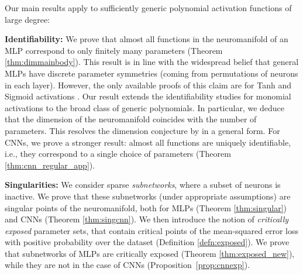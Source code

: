\documentclass{article} %
\theoremstyle{plain}%
\theoremstyle{definition}
\theoremstyle{remark}
\begin{document}
Our main results apply to sufficiently generic polynomial activation functions of large degree: 

\textbf{Identifiability:} We prove that almost all functions in the neuromanifold of an MLP correspond to only finitely many parameters (Theorem \ref{thm:dimmainbody}).
This result is in line with the widespread belief that general MLPs have discrete parameter symmetries (coming from permutations of neurons in each layer). 
However, the only available proofs of this claim are for Tanh and Sigmoid activations \citep{fefferman1994reconstructing,vlavcic2022neural}.
Our result extends the identifiability studies for monomial activations \citep{finkel2024activation,usevich2025identifiability} to the broad class of generic polynomials. %
In particular, we deduce that the dimension of the neuromanifold coincides with the number of parameters. This resolves the dimension conjecture by \citep{kileel2019expressive} in a general form. For CNNs, we prove a stronger result: almost all functions are uniquely identifiable, i.e., they correspond to a single choice of parameters (Theorem \ref{thm:cnn_regular_app}). 



\textbf{Singularities:} We consider sparse \emph{subnetworks}, where a subset of neurons is inactive. We prove that these subnetworks (under appropriate assumptions) are  singular points of the neuromanifold, both for MLPs (Theorem \ref{thm:singular}) and CNNs (Theorem \ref{thm:singcnn}). We then introduce the notion of \emph{critically exposed} parameter sets, that contain critical points of the mean-squared error loss with positive probability over the dataset (Definition \ref{defn:exposed}). We prove that subnetworks of MLPs are critically exposed (Theorem \ref{thm:exposed_new}), while they are not in the case of CNNs (Proposition~\ref{prop:cnnexp}).   
\end{document}
